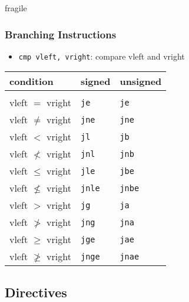 \documentclass[dvipsnames]{beamer}
\begin{document}
\begin{frame}{fragile}
  \frametitle{Branching Instructions}

  \begin{itemize}
   \item \lstinline|cmp vleft, vright|: compare vleft and vright
  \end{itemize}

  \begin{table}
    \begin{tabular}{lll}
      condition             & signed               & unsigned\\
      \hline\\
      vleft $=$ vright      & \lstinline|je|   & \lstinline|je|\\
      \hline
      vleft $\neq$ vright   & \lstinline|jne|  & \lstinline|jne|\\
      \hline
      vleft $<$ vright      & \lstinline|jl|   & \lstinline|jb|\\
      \hline
      vleft $\nless$ vright & \lstinline|jnl|  & \lstinline|jnb|\\
      \hline
      vleft $\leq$ vright   & \lstinline|jle|  & \lstinline|jbe|\\
      \hline
      vleft $\nleq$ vright  & \lstinline|jnle| & \lstinline|jnbe|\\
      \hline
      vleft $>$ vright      & \lstinline|jg|   & \lstinline|ja|\\
      \hline
      vleft $\ngtr$ vright  & \lstinline|jng|  & \lstinline|jna|\\
      \hline
      vleft $\geq$ vright   & \lstinline|jge|  & \lstinline|jae|\\
      \hline
      vleft $\ngeq$ vright  & \lstinline|jnge| & \lstinline|jnae|\\
    \end{tabular}
  \end{table}
\end{frame}

\subsection{Directives}
\end{document}
